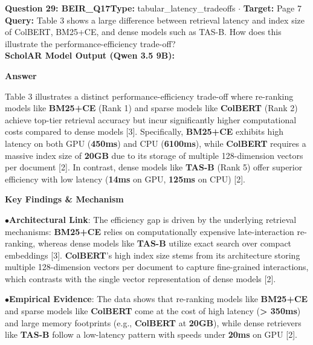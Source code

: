 \documentclass[10pt,a4paper]{article}
\begin{document}
\begin{tcolorbox}[questionbox]
{\noindent\bfseries\large\color{navy} Question 29: BEIR\_Q17}\hfill {\footnotesize\color{darkteal}\textbf{Type:} tabular\_latency\_tradeoffs $\cdot$ \textbf{Target:} Page 7}\\[4pt]
{\noindent\bfseries\color{accentblue} Query: } Table 3 shows a large difference between retrieval latency and index size of ColBERT, BM25+CE, and dense models such as TAS-B. How does this illustrate the performance-efficiency trade-off?\\[6pt]
{\noindent\bfseries\color{navy} ScholAR Model Output (Qwen 3.5 9B):}\\[2pt]
{\small \noindent \textbf{Answer}\par\vspace{3pt}Table 3 illustrates a distinct performance-efficiency trade-off where re-ranking models like \textbf{BM25+CE} (Rank 1) and sparse models like \textbf{ColBERT} (Rank 2) achieve top-tier retrieval accuracy but incur significantly higher computational costs compared to dense models [3]. Specifically, \textbf{BM25+CE} exhibits high latency on both GPU (\textbf{450ms}) and CPU (\textbf{6100ms}), while \textbf{ColBERT} requires a massive index size of \textbf{20GB} due to its storage of multiple 128-dimension vectors per document [2]. In contrast, dense models like \textbf{TAS-B} (Rank 5) offer superior efficiency with low latency (\textbf{14ms} on GPU, \textbf{125ms} on CPU) [2].\par\vspace{3pt}\noindent \textbf{Key Findings \& Mechanism}\par\vspace{3pt}\noindent\hspace*{8pt}$\bullet$\hspace*{4pt}\textbf{Architectural Link}: The efficiency gap is driven by the underlying retrieval mechanisms: \textbf{BM25+CE} relies on computationally expensive late-interaction re-ranking, whereas dense models like \textbf{TAS-B} utilize exact search over compact embeddings [3]. \textbf{ColBERT}'s high index size stems from its architecture storing multiple 128-dimension vectors per document to capture fine-grained interactions, which contrasts with the single vector representation of dense models [2].\par\vspace{3pt}\noindent\hspace*{8pt}$\bullet$\hspace*{4pt}\textbf{Empirical Evidence}: The data shows that re-ranking models like \textbf{BM25+CE} and sparse models like \textbf{ColBERT} come at the cost of high latency (\textbf{> 350ms}) and large memory footprints (e.g., \textbf{ColBERT} at \textbf{20GB}), while dense retrievers like \textbf{TAS-B} follow a low-latency pattern with speeds under \textbf{20ms} on GPU [2].}\\[6pt]

\end{tcolorbox}
\end{document}
